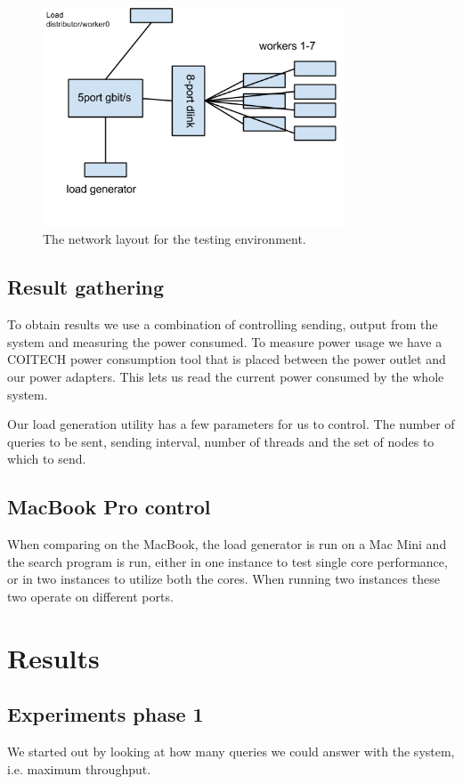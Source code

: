 \begin{figure}[h]
    \centering
    \includegraphics[width=0.8\textwidth]{experiments/networklayout}
    \caption{The network layout for the testing environment.}
    \label{fig:network}
\end{figure}


\subsection{Result gathering}
To obtain results we use a combination of controlling sending, output from the system and measuring the power consumed. To measure power usage we have a COITECH power consumption tool that is placed between the power outlet and our power adapters.
This lets us read the current power consumed by the whole system.

Our load generation utility has a few parameters for us to control. The number of queries to be sent, sending interval, number of threads and the set of nodes to which to send.

\subsection{MacBook Pro control}
When comparing on the MacBook, the load generator is run on a Mac Mini and the search program is run, either in one instance to test single core performance, or in two instances to utilize both the cores.
When running two instances these two operate on different ports.

\clearpage
\section{Results}
\subsection{Experiments phase 1}
We started out by looking at how many queries we could answer with the system, i.e. maximum throughput.

